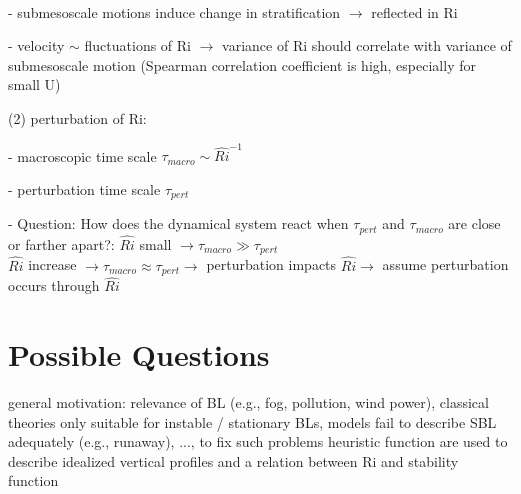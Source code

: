 \documentclass[11pt]{article}
\begin{document}
		\scriptsize
		 \\
		\begin{compactenum}
			\item[-] submesoscale motions induce change in stratification $\rightarrow$ reflected in Ri
			\item[-] velocity $\sim$ fluctuations of Ri
			$\rightarrow$ variance of Ri should correlate with variance of submesoscale motion (Spearman correlation coefficient is high, especially for small U)
	\end{compactenum}
(2) perturbation of Ri: \\
\begin{compactenum}
	\item[-] macroscopic time scale $\tau_{macro} \sim \widehat{Ri}^{-1}$
	\item[-] perturbation time scale $\tau_{pert}$
	\item[-] Question: How does the dynamical system react when $\tau_{pert}$ and $\tau_{macro}$ are close or farther apart?:
	$\widehat{Ri}$ small $\rightarrow \tau_{macro} \gg \tau_{pert}$ \\
	$\widehat{Ri}$ increase $\rightarrow \tau_{macro} \approx \tau_{pert} \rightarrow$ perturbation impacts $\widehat{Ri}\rightarrow$ assume perturbation occurs through $\widehat{Ri}$ \\
\end{compactenum}
	
	\normalsize
	
	\section{Possible Questions}
	general motivation: relevance of BL (e.g., fog, pollution, wind power), classical theories only suitable for instable / stationary BLs, models fail to describe SBL adequately (e.g., runaway), ..., to fix such problems heuristic function are used to describe idealized vertical profiles and a relation between Ri and stability function\\[0.3cm]
	
\end{document}
